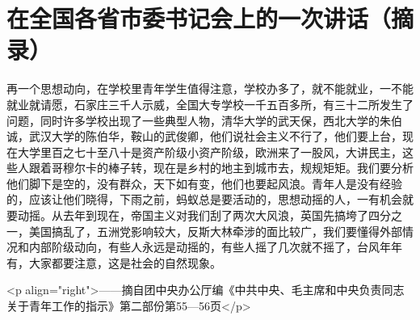 \section[在全国各省市委书记会上的一次讲话（摘录）（一九五七年二月）]{在全国各省市委书记会上的一次讲话（摘录）}


再一个思想动向，在学校里青年学生值得注意，学校办多了，就不能就业，一不能就业就请愿，石家庄三千人示威，全国大专学校一千五百多所，有三十二所发生了问题，同时许多学校出现了一些典型人物，清华大学的武天保，西北大学的朱伯诚，武汉大学的陈伯华，鞍山的武俊卿，他们说社会主义不行了，他们要上台，现在大学里百之七十至八十是资产阶级小资产阶级，欧洲来了一股风，大讲民主，这些人跟着哥穆尔卡的棒子转，现在是乡村的地主到城市去，规规矩矩。我们要分析他们脚下是空的，没有群众，天下如有变，他们也要起风浪。青年人是没有经验的，应该让他们晓得，下雨之前，蚂蚁总是要活动的，思想动摇的人，一有机会就要动摇。从去年到现在，帝国主义对我们刮了两次大风浪，英国先搞垮了四分之一，美国搞乱了，五洲党影响较大，反斯大林牵涉的面比较广，我们要懂得外部情况和内部阶级动向，有些人永远是动摇的，有些人摇了几次就不摇了，台风年年有，大家都要注意，这是社会的自然现象。

<p align="right">——摘自团中央办公厅编《中共中央、毛主席和中央负责同志关于青年工作的指示》第二部份第55—56页</p>


